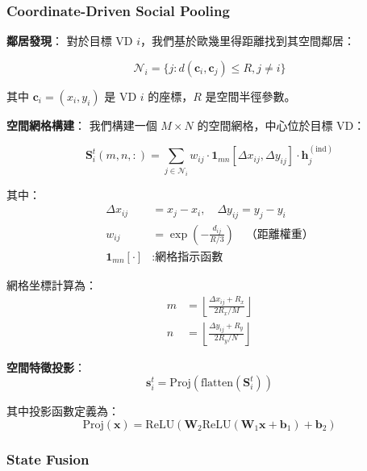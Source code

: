 \documentclass[11pt,a4paper]{article}
\begin{document}
\subsubsection{Coordinate-Driven Social Pooling}

\textbf{鄰居發現}：
對於目標 VD $i$，我們基於歐幾里得距離找到其空間鄰居：

\begin{equation}
\mathcal{N}_i = \{j : d(\mathbf{c}_i, \mathbf{c}_j) \leq R, j \neq i\}
\end{equation}

其中 $\mathbf{c}_i = (x_i, y_i)$ 是 VD $i$ 的座標，$R$ 是空間半徑參數。

\textbf{空間網格構建}：
我們構建一個 $M \times N$ 的空間網格，中心位於目標 VD：

\begin{equation}
\mathbf{S}_i^t(m, n, :) = \sum_{j \in \mathcal{N}_i} w_{ij} \cdot \mathbf{1}_{mn}[\Delta x_{ij}, \Delta y_{ij}] \cdot \mathbf{h}_j^{(\text{ind})}
\end{equation}

其中：
\begin{align}
\Delta x_{ij} &= x_j - x_i, \quad \Delta y_{ij} = y_j - y_i \\
w_{ij} &= \exp\left(-\frac{d_{ij}}{R/3}\right) \quad \text{（距離權重）} \\
\mathbf{1}_{mn}[\cdot] &: \text{網格指示函數}
\end{align}

網格坐標計算為：
\begin{align}
m &= \left\lfloor \frac{\Delta x_{ij} + R_x}{2R_x / M} \right\rfloor \\
n &= \left\lfloor \frac{\Delta y_{ij} + R_y}{2R_y / N} \right\rfloor
\end{align}

\textbf{空間特徵投影}：
\begin{equation}
\mathbf{s}_i^t = \text{Proj}(\text{flatten}(\mathbf{S}_i^t))
\end{equation}

其中投影函數定義為：
\begin{equation}
\text{Proj}(\mathbf{x}) = \text{ReLU}(\mathbf{W}_2 \text{ReLU}(\mathbf{W}_1 \mathbf{x} + \mathbf{b}_1) + \mathbf{b}_2)
\end{equation}

\subsubsection{State Fusion}
\end{document}
